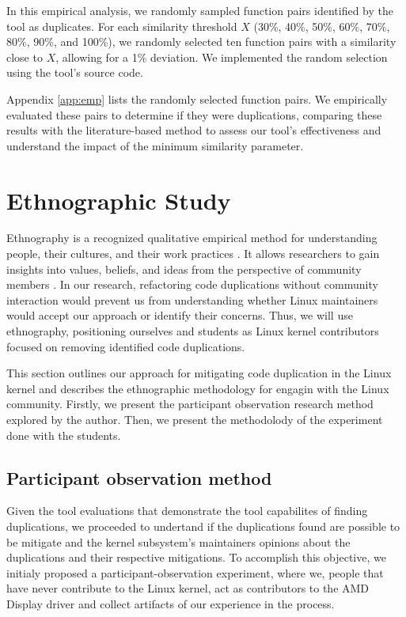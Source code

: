 In this empirical analysis, we randomly sampled function pairs identified by the tool as duplicates. For each similarity threshold \(X\) (30\%, 40\%, 50\%, 60\%, 70\%, 80\%, 90\%, and 100\%), we randomly selected ten function pairs with a similarity close to \(X\), allowing for a 1\% deviation. We implemented the random selection using the tool's source code.

Appendix \ref{app:emp} lists the randomly selected function pairs. We empirically evaluated these pairs to determine if they were duplications, comparing these results with the literature-based method to assess our tool's effectiveness and understand the impact of the minimum similarity parameter.


\section{Ethnographic Study}

\label{sec:meteth}

Ethnography is a recognized qualitative empirical method for understanding people, 
their cultures, and their work practices \citep{bookethno}. It allows researchers 
to gain insights into values, beliefs, and ideas from the perspective of community 
members \citep{ethnosoft}. In our research, refactoring code duplications without 
community interaction would prevent us from understanding whether Linux maintainers 
would accept our approach or identify their concerns. Thus, we will use ethnography, 
positioning ourselves and students as Linux kernel contributors focused on removing 
identified  code duplications.

This section outlines our approach for mitigating code duplication in the Linux kernel
and describes the ethnographic methodology for engagin with the Linux community. Firstly, 
we present the participant observation research method explored by the author. Then, 
we present the methodolody of the experiment done with the students.

\subsection{Participant observation method}
\label{subsec:partmethod}

Given the tool evaluations that demonstrate the tool capabilites of finding duplications, 
we proceeded to undertand if the duplications found are possible to be mitigate and
the kernel subsystem's maintainers opinions about the duplications and their respective mitigations.
To accomplish this objective, we initialy proposed a participant-observation experiment, 
where we, people that have never contribute to the Linux kernel, 
act as contributors to the AMD Display driver and collect artifacts of our experience in the process.

